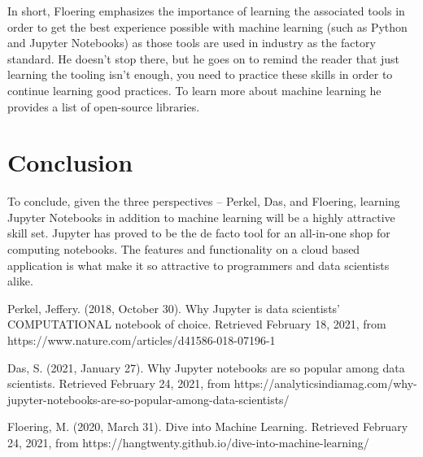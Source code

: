 \documentclass[conference]{IEEEtran}
\begin{document}
In short, Floering emphasizes the importance of learning the associated tools in order to get the best experience possible with machine learning (such as Python and Jupyter Notebooks) as those tools are used in industry as the factory standard. He doesn’t stop there, but he goes on to remind the reader that just learning the tooling isn’t enough, you need to practice these skills in order to continue learning good practices. To learn more about machine learning he provides a list of open-source libraries.\\

\section{Conclusion}
To conclude, given the three perspectives -- Perkel, Das, and Floering, learning Jupyter Notebooks in addition to machine learning will be a highly attractive skill set. Jupyter has proved to be the de facto tool for an all-in-one shop for computing notebooks. The features and functionality on a cloud based application is what make it so attractive to programmers and data scientists alike.\\


\begin{thebibliography}{00}

 Perkel, Jeffery. (2018, October 30). Why Jupyter is data scientists' COMPUTATIONAL notebook of choice. Retrieved February 18, 2021, from https://www.nature.com/articles/d41586-018-07196-1

 Das, S. (2021, January 27). Why Jupyter notebooks are so popular among data scientists. Retrieved February 24, 2021, from https://analyticsindiamag.com/why-jupyter-notebooks-are-so-popular-among-data-scientists/

\cite{b3} Floering, M. (2020, March 31). Dive into Machine Learning. Retrieved February 24, 2021, from https://hangtwenty.github.io/dive-into-machine-learning/

\end{thebibliography}
\vspace{12pt}

\end{document}
